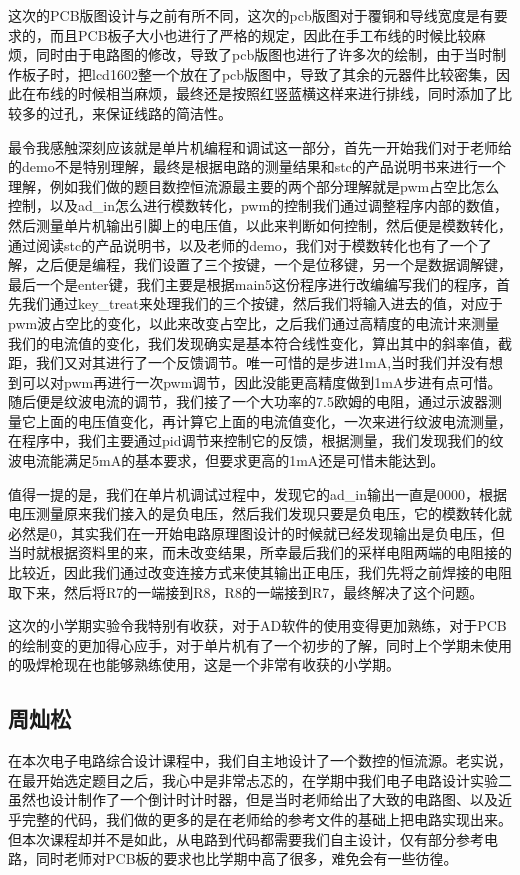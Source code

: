 \documentclass{../source/zjureport}
\begin{document}
        这次的PCB版图设计与之前有所不同，这次的pcb版图对于覆铜和导线宽度是有要求的，而且PCB板子大小也进行了严格的规定，因此在手工布线的时候比较麻烦，同时由于电路图的修改，导致了pcb版图也进行了许多次的绘制，由于当时制作板子时，把lcd1602整一个放在了pcb版图中，导致了其余的元器件比较密集，因此在布线的时候相当麻烦，最终还是按照红竖蓝横这样来进行排线，同时添加了比较多的过孔，来保证线路的简洁性。

        最令我感触深刻应该就是单片机编程和调试这一部分，首先一开始我们对于老师给的demo不是特别理解，最终是根据电路的测量结果和stc的产品说明书来进行一个理解，例如我们做的题目数控恒流源最主要的两个部分理解就是pwm占空比怎么控制，以及ad_in怎么进行模数转化，pwm的控制我们通过调整程序内部的数值，然后测量单片机输出引脚上的电压值，以此来判断如何控制，然后便是模数转化，通过阅读stc的产品说明书，以及老师的demo，我们对于模数转化也有了一个了解，之后便是编程，我们设置了三个按键，一个是位移键，另一个是数据调解键，最后一个是enter键，我们主要是根据main5这份程序进行改编编写我们的程序，首先我们通过key_treat来处理我们的三个按键，然后我们将输入进去的值，对应于pwm波占空比的变化，以此来改变占空比，之后我们通过高精度的电流计来测量我们的电流值的变化，我们发现确实是基本符合线性变化，算出其中的斜率值，截距，我们又对其进行了一个反馈调节。唯一可惜的是步进1mA,当时我们并没有想到可以对pwm再进行一次pwm调节，因此没能更高精度做到1mA步进有点可惜。随后便是纹波电流的调节，我们接了一个大功率的7.5欧姆的电阻，通过示波器测量它上面的电压值变化，再计算它上面的电流值变化，一次来进行纹波电流测量，在程序中，我们主要通过pid调节来控制它的反馈，根据测量，我们发现我们的纹波电流能满足5mA的基本要求，但要求更高的1mA还是可惜未能达到。

        值得一提的是，我们在单片机调试过程中，发现它的ad_in输出一直是0000，根据电压测量原来我们接入的是负电压，然后我们发现只要是负电压，它的模数转化就必然是0，其实我们在一开始电路原理图设计的时候就已经发现输出是负电压，但当时就根据资料里的来，而未改变结果，所幸最后我们的采样电阻两端的电阻接的比较近，因此我们通过改变连接方式来使其输出正电压，我们先将之前焊接的电阻取下来，然后将R7的一端接到R8，R8的一端接到R7，最终解决了这个问题。

        这次的小学期实验令我特别有收获，对于AD软件的使用变得更加熟练，对于PCB的绘制变的更加得心应手，对于单片机有了一个初步的了解，同时上个学期未使用的吸焊枪现在也能够熟练使用，这是一个非常有收获的小学期。
        \newpage
        
        \subsection{周灿松}
        在本次电子电路综合设计课程中，我们自主地设计了一个数控的恒流源。老实说，在最开始选定题目之后，我心中是非常忐忑的，在学期中我们电子电路设计实验二虽然也设计制作了一个倒计时计时器，但是当时老师给出了大致的电路图、以及近乎完整的代码，我们做的更多的是在老师给的参考文件的基础上把电路实现出来。但本次课程却并不是如此，从电路到代码都需要我们自主设计，仅有部分参考电路，同时老师对PCB板的要求也比学期中高了很多，难免会有一些彷徨。
\end{document}

